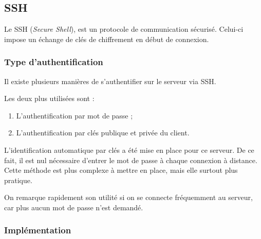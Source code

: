 \subsection{SSH}
\label{subsec:ssh}

Le SSH (\emph{Secure Shell}), est un protocole de communication
sécurisé. Celui-ci impose un échange de clés de chiffrement en début de
connexion.

\subsubsection{Type d'authentification}
\label{subsubsec:type-authentification}

Il existe plusieurs manières de s'authentifier sur le serveur via SSH.

Les deux plus utilisées sont :
\begin{enumerate}
\item L'authentification par mot de passe ;
\item L'authentification par clés publique et privée du client.
\end{enumerate}

L'identification automatique par clés a été mise en place pour ce serveur. De ce
fait, il est nul nécessaire d'entrer le mot de passe à chaque connexion à
distance. \\
Cette méthode est plus complexe à mettre en place, mais elle surtout plus
pratique.

On remarque rapidement son utilité si on se connecte fréquemment au serveur, car
plus aucun mot de passe n'est demandé.

\subsubsection{Implémentation}
\label{subsubsec:implementation}

